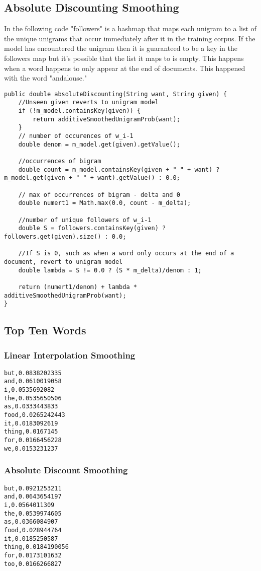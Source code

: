 \documentclass[paper=a4, fontsize=11pt]{jhwhw} %
\begin{document}
\subsection{Absolute Discounting Smoothing}
In the following code "followers" is a hashmap that maps each unigram to a list of the unique unigrams that occur immediately
after it in the training corpus. If the model has encountered the unigram then it is guaranteed to be a key in the followers map
but it's possible that the list it maps to is empty. This happens when a word happens to only appear at the end of documents. This
happened with the word "andalouse." 
\begin{lstlisting}
public double absoluteDiscounting(String want, String given) {
    //Unseen given reverts to unigram model
    if (!m_model.containsKey(given)) {
        return additiveSmoothedUnigramProb(want);
    }
    // number of occurences of w_i-1
    double denom = m_model.get(given).getValue();

    //occurrences of bigram
    double count = m_model.containsKey(given + " " + want) ? m_model.get(given + " " + want).getValue() : 0.0;

    // max of occurrences of bigram - delta and 0
    double numert1 = Math.max(0.0, count - m_delta);

    //number of unique followers of w_i-1
    double S = followers.containsKey(given) ? followers.get(given).size() : 0.0;

    //If S is 0, such as when a word only occurs at the end of a document, revert to unigram model
    double lambda = S != 0.0 ? (S * m_delta)/denom : 1;

    return (numert1/denom) + lambda * additiveSmoothedUnigramProb(want);
}
\end{lstlisting}

\subsection{Top Ten Words}
\subsubsection{Linear Interpolation Smoothing}
\begin{verbatim}
but,0.0838202335
and,0.0610019058
i,0.0535692082
the,0.0535650506
as,0.0333443833
food,0.0265242443
it,0.0183092619
thing,0.0167145
for,0.0166456228
we,0.0153231237
\end{verbatim}

\subsubsection{Absolute Discount Smoothing}
\begin{verbatim}
but,0.0921253211
and,0.0643654197
i,0.0564011309
the,0.0539974605
as,0.0366084907
food,0.028944764
it,0.0185250587
thing,0.0184190056
for,0.0173101632
too,0.0166266827
\end{verbatim}
\end{document}
